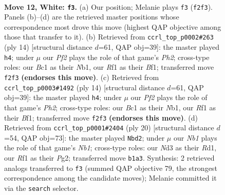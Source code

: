 \documentclass[11pt]{article}
\begin{document}
\clearpage

\begin{figure}[p]\centering
\begin{subfigure}{0.46\textwidth}\centering
\resizebox{\linewidth}{!}{%
\newchessgame
\chessboard[
  setfen={rn1kbbr1/1p3ppp/p3pn2/2P5/P1B5/3NP3/1P3PPP/RNB2RK1 w - - 4 12},
  showmover=false,
  pgfstyle=straightmove, color=movearrow, markmove={f2-f3}
]}
\caption{}
\end{subfigure}\hfill
\begin{subfigure}{0.46\textwidth}\centering
\resizebox{\linewidth}{!}{%
\newchessgame
\chessboard[
  setfen={r1b1kb1r/ppp2pp1/2n4p/3nP3/8/P4N2/1P2PPPP/RNB1KB1R w KQkq - 0 8},
  showmover=false,
  pgfstyle=straightmove, color=movearrow, markmove={h2-h4}
]}
\caption{}
\end{subfigure}
\\[4pt]
\begin{subfigure}{0.46\textwidth}\centering
\resizebox{\linewidth}{!}{%
\newchessgame
\chessboard[
  setfen={r1b1kb1r/ppp2pp1/2n4p/3nP3/8/P4N2/1P2PPPP/RNB1KB1R w KQkq - 0 8},
  showmover=false,
  pgfstyle=straightmove, color=movearrow, markmove={h2-h4}
]}
\caption{}
\end{subfigure}\hfill
\begin{subfigure}{0.46\textwidth}\centering
\resizebox{\linewidth}{!}{%
\newchessgame
\chessboard[
  setfen={r1b1k2r/1p2bppp/p1n1pn2/8/1PB5/P3PN2/5PPP/RNBR2K1 w kq - 1 11},
  showmover=false,
  pgfstyle=straightmove, color=movearrow, markmove={b1-d2}
]}
\caption{}
\end{subfigure}
\caption{\textbf{Move 12, White: \texttt{f3}.} (a) Our position; Melanie plays \texttt{f3} (\texttt{f2f3}). Panels (b)--(d) are the retrieved master positions whose correspondence most drove this move (highest QAP objective among those that transfer to it). (b) Retrieved from \texttt{ccrl\_top\_p0002\#263} (ply 14) [structural distance $d$=61, QAP obj=39]: the master played \texttt{h4}; under $\mu$ our \emph{Pf2} plays the role of that game's \emph{Ph2}; cross-type roles: our \emph{B}c1 as their \emph{N}b1, our \emph{R}f1 as their \emph{B}f1; transferred move \texttt{f2f3} \textbf{(endorses this move)}. (c) Retrieved from \texttt{ccrl\_top\_p0003\#1492} (ply 14) [structural distance $d$=61, QAP obj=39]: the master played \texttt{h4}; under $\mu$ our \emph{Pf2} plays the role of that game's \emph{Ph2}; cross-type roles: our \emph{B}c1 as their \emph{N}b1, our \emph{R}f1 as their \emph{B}f1; transferred move \texttt{f2f3} \textbf{(endorses this move)}. (d) Retrieved from \texttt{ccrl\_top\_p0001\#2404} (ply 20) [structural distance $d$=54, QAP obj=73]: the master played \texttt{Nbd2}; under $\mu$ our \emph{Nb1} plays the role of that game's \emph{Nb1}; cross-type roles: our \emph{N}d3 as their \emph{R}d1, our \emph{R}f1 as their \emph{P}g2; transferred move \texttt{b1a3}. Synthesis: 2 retrieved analogs transferred to \texttt{f3} (summed QAP objective 79, the strongest correspondence among the candidate moves); Melanie committed it via the \texttt{search} selector.}
\label{fig:thought-m22}
\end{figure}
\end{document}
